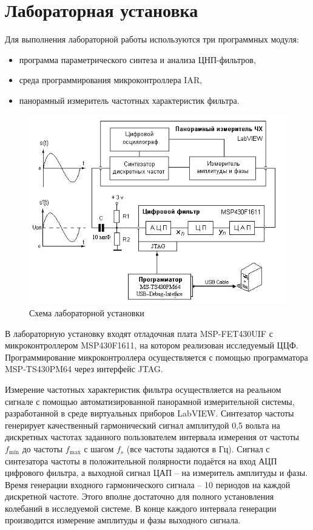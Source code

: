 \documentclass[a4paper,14pt]{extarticle}
\begin{document}
\section{Лабораторная установка}

Для выполнения лабораторной работы используются три программных модуля: 
\begin{itemize}
  \item программа параметрического синтеза и анализа ЦНП-фильтров,
  \item среда программирования микроконтроллера IAR,
  \item панорамный измеритель частотных характеристик фильтра. 
\end{itemize}
\begin{figure}[H]
  \centering
  \includegraphics[width=\textwidth]{img/img3}
  \caption{Схема лабораторной установки}
  \label{fig:figure3}
\end{figure}

В лабораторную установку входят отладочная плата MSP-FET430UIF с микроконтроллером MSP430F1611, на котором реализован исследуемый ЦЦФ. Программирование микроконтроллера осуществляется с помощью программатора MSP-TS430PM64 через интерфейс JTAG. 

Измерение частотных характеристик фильтра осуществляется на реальном сигнале с помощью автоматизированной панорамной измерительной системы, разработанной в среде виртуальных приборов LabVIEW. Синтезатор частоты генерирует качественный гармонический сигнал амплитудой 0,5 вольта на дискретных частотах заданного пользователем интервала измерения от частоты $f_{\min}$ до частоты $f_{\max}$ с шагом $f_s$ (все частоты задаются в Гц). Сигнал с синтезатора частоты в положительной полярности подаётся на вход АЦП цифрового фильтра, а выходной сигнал ЦАП – на измеритель амплитуды и фазы. Время генерации входного гармонического сигнала -- 10 периодов на каждой дискретной частоте. Этого вполне достаточно для полного установления колебаний в исследуемой системе. В конце каждого интервала генерации производится измерение амплитуды и фазы выходного сигнала. 
  
\end{document}
